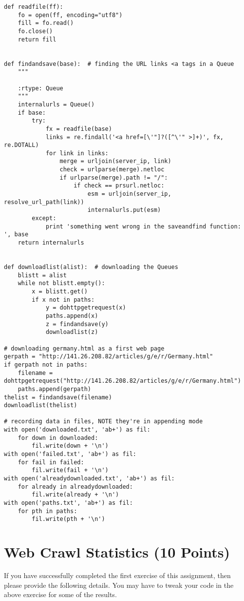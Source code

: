 \documentclass{WeSTassignment}
\begin{document}
\begin{lstlisting}
def readfile(ff):
    fo = open(ff, encoding="utf8")
    fill = fo.read()
    fo.close()
    return fill


def findandsave(base):  # finding the URL links <a tags in a Queue
    """

    :rtype: Queue
    """
    internalurls = Queue()
    if base:
        try:
            fx = readfile(base)
            links = re.findall('<a href=[\'"]?([^\'" >]+)', fx, re.DOTALL)
            for link in links:
                merge = urljoin(server_ip, link)
                check = urlparse(merge).netloc
                if urlparse(merge).path != "/":
                    if check == prsurl.netloc:
                        esm = urljoin(server_ip, resolve_url_path(link))
                        internalurls.put(esm)
        except:
            print 'something went wrong in the saveandfind function: ', base
    return internalurls


def downloadlist(alist):  # downloading the Queues
    blistt = alist
    while not blistt.empty():
        x = blistt.get()
        if x not in paths:
            y = dohttpgetrequest(x)
            paths.append(x)
            z = findandsave(y)
            downloadlist(z)

# downloading germany.html as a first web page
gerpath = "http://141.26.208.82/articles/g/e/r/Germany.html"
if gerpath not in paths:
    filename = dohttpgetrequest("http://141.26.208.82/articles/g/e/r/Germany.html")
    paths.append(gerpath)
thelist = findandsave(filename)
downloadlist(thelist)

# recording data in files, NOTE they're in appending mode
with open('downloaded.txt', 'ab+') as fil:
    for down in downloaded:
        fil.write(down + '\n')
with open('failed.txt', 'ab+') as fil:
    for fail in failed:
        fil.write(fail + '\n')
with open('alreadydownloaded.txt', 'ab+') as fil:
    for already in alreadydownloaded:
        fil.write(already + '\n')
with open('paths.txt', 'ab+') as fil:
    for pth in paths:
        fil.write(pth + '\n')

\end{lstlisting}

\section{Web Crawl Statistics (10 Points)}

If you have successfully completed the first exercise of this assignment, then please provide the following details. You may have to tweak your code in the above exercise for some of the results. 
\end{document}
